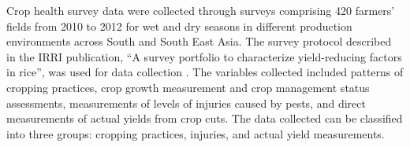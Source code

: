 Crop health survey data were collected through surveys comprising 420 farmers' fields from 2010 to 2012 for wet and dry seasons in different production environments across South and South East Asia. The survey protocol described in the IRRI publication, ``A survey portfolio to characterize yield-reducing factors in rice'', was used for data collection \citep{Savarysurvey2009} . The variables collected included patterns of cropping practices, crop growth measurement and crop management status assessments, measurements of levels of injuries caused by pests, and direct measurements of actual yields from crop cuts. The data collected can be classified into three groups: cropping practices, injuries, and actual yield measurements.